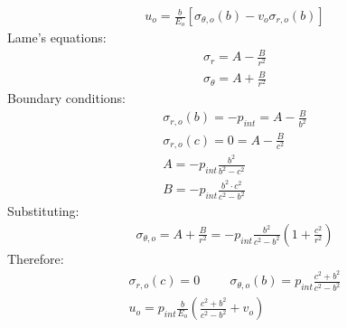 \documentclass[class=report, crop=false, 12pt,a4paper]{standalone}
\begin{document}
\begin{gather}
    u_o = \frac{b}{E_o}\left[\sigma_{\theta,o} (b) - v_o \sigma_{r,o}(b)\right]
\end{gather}
Lame's equations:
\begin{gather}
    \sigma_r = A - \frac{B}{r^2}\\
    \sigma_{\theta} = A + \frac{B}{r^2}
\end{gather}
Boundary conditions:
\begin{gather}
    \sigma_{r,o}(b) = -p_{int} = A - \frac{B}{b^2}\\
    \sigma_{r,o}(c) = 0 = A - \frac{B}{c^2}\\
    A = -p_{int} \frac{b^2}{b^2- c^2}\\
    B = -p_{int} \frac{b^2 \cdot c^2}{c^2 - b^2}
\end{gather}
Substituting:
\begin{gather}
    \sigma_{\theta,o} = A + \frac{B}{r^2} = -p_{int} \frac{b^2}{c^2 - b^2} \left(1+ \frac{c^2}{r^2}\right)
\end{gather}
Therefore:
\begin{gather}
    \sigma_{r,o}(c) = 0 \hspace{1cm} \sigma_{\theta,o}(b) = p_{int}\frac{c^2 + b^2}{c^2 -b^2}\\
    u_o = p_{int} \frac{b}{E_o}\left(\frac{c^2 + b^2}{c^2 - b^2} + v_o\right)
\end{gather}
\end{document}
